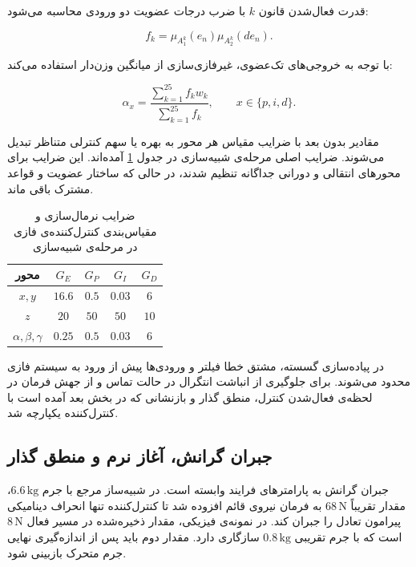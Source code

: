 قدرت فعال‌شدن قانون $k$ با ضرب درجات عضویت دو ورودی محاسبه می‌شود:

\begin{equation}
	f_k=\mu_{A_1^k}(e_n)\mu_{A_2^k}(de_n).
\end{equation}

با توجه به خروجی‌های تک‌عضوی، غیرفازی‌سازی از میانگین وزن‌دار استفاده می‌کند:

\begin{equation}
	\alpha_x=\frac{\sum_{k=1}^{25}f_kw_k}{\sum_{k=1}^{25}f_k},
	\qquad x\in\{p,i,d\}.
	\label{eq:method-defuzzification}
\end{equation}

مقادیر بدون بعد با ضرایب مقیاس هر محور به بهره یا سهم کنترلی متناظر تبدیل می‌شوند. ضرایب اصلی مرحله‌ی شبیه‌سازی در جدول \ref{tab:method-fuzzy-gains} آمده‌اند. این ضرایب برای محورهای انتقالی و دورانی جداگانه تنظیم شدند، در حالی که ساختار عضویت و قواعد مشترک باقی ماند.

\begin{table}[htbp]
	\centering
	\small
	\caption{ضرایب نرمال‌سازی و مقیاس‌بندی کنترل‌کننده‌ی فازی در مرحله‌ی شبیه‌سازی}
	\label{tab:method-fuzzy-gains}
	\begin{tabular}{|c|c|c|c|c|}
		\hline \textbf{محور} & $G_E$ & $G_P$ & $G_I$ & $G_D$\\ \hline
		$x,y$ & $16.6$ & $0.5$ & $0.03$ & $6$\\ \hline
		$z$ & $20$ & $50$ & $50$ & $10$\\ \hline
		$\alpha,\beta,\gamma$ & $0.25$ & $0.5$ & $0.03$ & $6$\\ \hline
	\end{tabular}
\end{table}

در پیاده‌سازی گسسته، مشتق خطا فیلتر و ورودی‌ها پیش از ورود به سیستم فازی محدود می‌شوند. برای جلوگیری از انباشت انتگرال در حالت تماس و از جهش فرمان در لحظه‌ی فعال‌شدن کنترل، منطق گذار و بازنشانی که در بخش بعد آمده است با کنترل‌کننده یکپارچه شد.

\subsection{جبران گرانش، آغاز نرم و منطق گذار}
\label{subsec:method-state-machine}

جبران گرانش به پارامترهای فرایند وابسته است. در شبیه‌ساز مرجع با جرم $6.6\,\mathrm{kg}$، مقدار تقریباً $68\,\mathrm N$ به فرمان نیروی قائم افزوده شد تا کنترل‌کننده تنها انحراف دینامیکی پیرامون تعادل را جبران کند. در نمونه‌ی فیزیکی، مقدار ذخیره‌شده در مسیر فعال $8\,\mathrm N$ است که با جرم تقریبی $0.8\,\mathrm{kg}$ سازگاری دارد. مقدار دوم باید پس از اندازه‌گیری نهایی جرم متحرک بازبینی شود.

